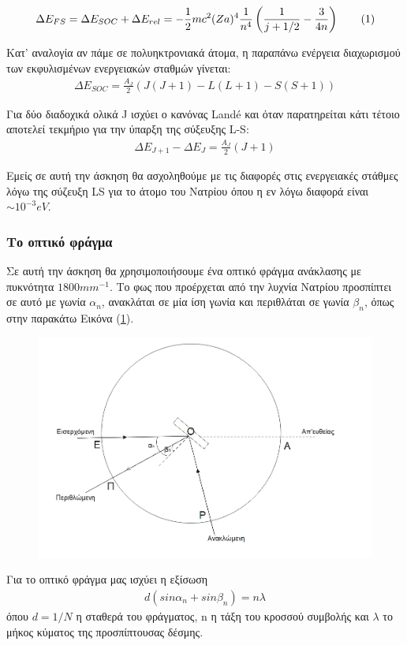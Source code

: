 \documentclass[a4paper]{article}
\newcommand\numberthis{\addtocounter{equation}{1}\tag{\theequation}}
\begin{document}
	\begin{align*}\label{3}
		\Delta E_{FS} = \Delta E_{SOC} + \Delta E_{rel} = -\frac{1}{2}mc^2(Za)^4 \frac{1}{n^4}\left( \frac{1}{j+1/2}-\frac{3}{4n}\right) \numberthis
	\end{align*}

Κατ' αναλογία αν πάμε σε πολυηκτρονιακά άτομα, η παραπάνω ενέργεια διαχωρισμού των εκφυλισμένων ενεργειακών σταθμών γίνεται:
	\begin{align}\label{4}
		\Delta E_{SOC}= \frac{A_J}{2}\left(J(J+1)-L(L+1)-S(S+1)\right) 
	\end{align}
	
	Για δύο διαδοχικά ολικά J ισχύει ο κανόνας Landé και όταν παρατηρείται κάτι τέτοιο αποτελεί τεκμήριο για την ύπαρξη της σύξευξης L-S: 
	\begin{align}\label{5}
		\Delta E_{J+1} - \Delta E_{J} = \frac{A_J}{2}(J+1)
	\end{align}
	
	Εμείς σε αυτή την άσκηση θα ασχοληθούμε με τις διαφορές στις ενεργειακές στάθμες λόγω της σύζευξη LS για το άτομο του Νατρίου όπου η εν λόγω διαφορά είναι $\sim 10^{-3}eV$.
	
\subsubsection*{Το οπτικό φράγμα}	

Σε αυτή την άσκηση θα χρησιμοποιήσουμε ένα οπτικό φράγμα ανάκλασης με πυκνότητα $1800mm^{-1}$. Το φως που προέρχεται από την λυχνία Νατρίου προσπίπτει σε αυτό με γωνία $\alpha_n$, ανακλάται σε μία ίση γωνία και περιθλάται σε γωνία $\beta_n$, όπως στην παρακάτω Εικόνα (\ref{Im2}). 
	\begin{figure}[h!]
		\centering
		\includegraphics[width=0.6\linewidth]{2nd.png}
		\caption{ }
		\label{Im2}
	\end{figure}
	
Για το οπτικό φράγμα μας ισχύει η εξίσωση 	
	\begin{align}\label{6}
		d(sin\alpha_n+ sin\beta_n)=n\lambda 
	\end{align}
	όπου $d=1/N$ η σταθερά του φράγματος, n η τάξη του κροσσού συμβολής και $\lambda$ το μήκος κύματος της προσπίπτουσας δέσμης.
\end{document}
